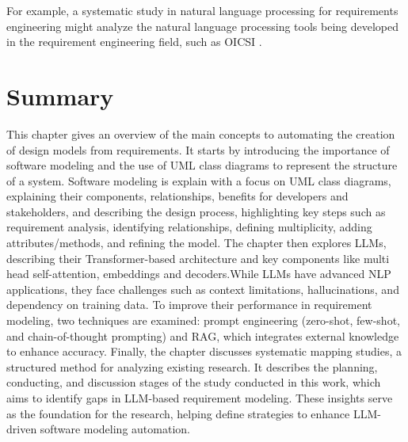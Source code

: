 For example, a systematic study in natural language processing for requirements engineering might analyze the natural language processing tools being developed in the requirement engineering field, such as OICSI \cite{25BZhao2021}.

\section{Summary}
This chapter gives an overview of the main concepts to automating the creation of design models from requirements. It starts by introducing the importance of software modeling and the use of UML class diagrams to represent the structure of a system. 
Software modeling is explain with a focus on UML class diagrams, explaining their components, relationships, benefits for developers and stakeholders, and describing the design process, highlighting key steps such as requirement analysis, identifying relationships, defining multiplicity, adding attributes/methods, and refining the model.
The chapter then explores LLMs, describing their Transformer-based architecture and key components like multi head self-attention, embeddings and decoders.While LLMs have advanced NLP applications, they face challenges such as context limitations, hallucinations, and dependency on training data. To improve their performance in requirement modeling, two techniques are examined: prompt engineering (zero-shot, few-shot, and chain-of-thought prompting) and RAG, which integrates external knowledge to enhance accuracy.
Finally, the chapter discusses systematic mapping studies, a structured method for analyzing existing research. It describes the planning, conducting, and discussion stages of the study conducted in this work, which aims to identify gaps in LLM-based requirement modeling. These insights serve as the foundation for the research, helping define strategies to enhance LLM-driven software modeling automation.